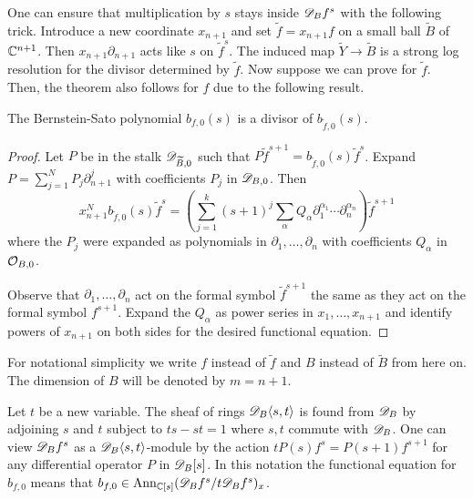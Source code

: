 One can ensure that multiplication by $s$ stays inside $\mathscr{D}_B f^s$ with the following trick.
Introduce a new coordinate $x_{n+1}$ and set $\widetilde{f}= x_{n+1}f$ on a small ball $\widetilde{B}$ of $\mathbb{C}^{n+1}$.
Then $x_{n+1}\partial_{n+1}$ acts like $s$ on $\widetilde{f}^s$.
The induced map $\widetilde{Y} \to \widetilde{B}$ is a strong log resolution for the divisor determined by $\widetilde{f}$.
Now suppose we can prove  for $\widetilde{f}$.
Then, the theorem also follows for $f$ due to the following result.
\begin{lemma}{\cite[Section 3.32]{bjork1979rings}}\label{lem: BernsteinTilde}
  The Bernstein-Sato polynomial $b_{f,0}(s)$ is a divisor of $b_{\widetilde{f},0}(s)$.
\end{lemma}
\begin{proof}
  Let $P$ be in the stalk $\mathscr{D}_{\widetilde{B},0}$ such that $P \widetilde{f}^{s+1} = b_{\widetilde{f},0}(s) \widetilde{f}^s $.
  Expand $P = \sum_{j=1}^N P_j  \partial_{n+1}^{j}$
  with coefficients $P_j$ in $\mathscr{D}_{B,0}$.
  Then
  $$x_{n+1}^N b_{\widetilde{f},0}(s) \widetilde{f}^s = \left(\sum_{j=1}^k (s + 1)^{j} \sum_\alpha Q_{\alpha} \partial_1^{\alpha_1}\cdots \partial_n^{\alpha_n} \right)\widetilde{f}^{s+1}$$
  where the $P_j$ were expanded as polynomials in $\partial_1,\ldots,\partial_n$ with coefficients $Q_{\alpha}$ in $\mathcal{O}_{B,0}$.

  Observe that $\partial_1,\ldots, \partial_n$ act on the formal symbol $\widetilde{f}^{s+1}$ the same as they act on the formal symbol $f^{s+1}$.
  Expand the $Q_{\alpha}$ as power series in $x_1,\ldots,x_{n+1}$ and identify powers of $x_{n+1}$ on both sides for the desired functional equation.
\end{proof}
For notational simplicity we write $f$ instead of $\widetilde{f}$ and $B$ instead of $\widetilde{B}$ from here on.
The dimension of $B$ will be denoted by $m=n+1$.

Let $t$ be a new variable.
The sheaf of rings $\mathscr{D}_B\langle s,t\rangle$ is found from $\mathscr{D}_B$ by adjoining $s$ and $t$ subject to $ts -st = 1$ where $s,t$ commute with $\mathscr{D}_B$.
One can view $\mathscr{D}_B f^s$ as a $\mathscr{D}_B\langle s,t\rangle$-module by the action $t P(s)f^s = P(s+1) f^{s+1}$ for any differential operator $P$ in $\mathscr{D}_B[s]$.
In this notation the functional equation for $b_{f,0}$ means that $b_{f,0}\in \operatorname{Ann}_{\mathbb{C}[s]} (\mathscr{D}_B f^s / t \mathscr{D}_B f^s)_x$.

